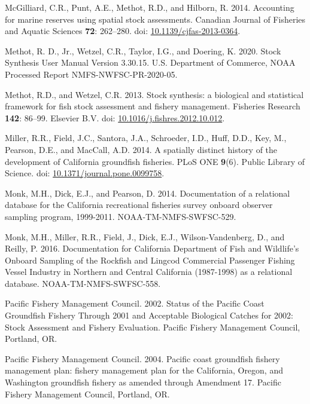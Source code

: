 \documentclass[11pt,
  english,
]{article}
\newlength{\cslhangindent}
\newenvironment{CSLReferences}[2] %
 {%
  \setlength{\parindent}{0pt}
  \ifodd #1 \everypar{\setlength{\hangindent}{\cslhangindent}}\ignorespaces\fi
  \ifnum #2 > 0
  \setlength{\parskip}{#2\baselineskip}
  \fi
 }%
 {}
\begin{document}
\begin{CSLReferences}{1}{0}
\leavevmode{}%
McGilliard, C.R., Punt, A.E., Methot, R.D., and Hilborn, R. 2014. {Accounting for marine reserves using spatial stock assessments}. Canadian Journal of Fisheries and Aquatic Sciences \textbf{72}: 262--280. doi: \href{https://doi.org/10.1139/cjfas-2013-0364}{10.1139/cjfas-2013-0364}.

\leavevmode{}%
Methot, R. D., Jr., Wetzel, C.R., Taylor, I.G., and Doering, K. 2020. {Stock Synthesis User Manual Version 3.30.15}. U.S. Department of Commerce, NOAA Processed Report NMFS-NWFSC-PR-2020-05.

\leavevmode{}%
Methot, R.D., and Wetzel, C.R. 2013. {Stock synthesis: a biological and statistical framework for fish stock assessment and fishery management}. Fisheries Research \textbf{142}: 86--99. Elsevier B.V. doi: \href{https://doi.org/10.1016/j.fishres.2012.10.012}{10.1016/j.fishres.2012.10.012}.

\leavevmode{}%
Miller, R.R., Field, J.C., Santora, J.A., Schroeder, I.D., Huff, D.D., Key, M., Pearson, D.E., and MacCall, A.D. 2014. {A spatially distinct history of the development of California groundfish fisheries}. PLoS ONE \textbf{9}(6). Public Library of Science. doi: \href{https://doi.org/10.1371/journal.pone.0099758}{10.1371/journal.pone.0099758}.

\leavevmode{}%
Monk, M.H., Dick, E.J., and Pearson, D. 2014. {Documentation of a relational database for the California recreational fisheries survey onboard observer sampling program, 1999-2011}. NOAA-TM-NMFS-SWFSC-529.

\leavevmode{}%
Monk, M.H., Miller, R.R., Field, J., Dick, E.J., Wilson-Vandenberg, D., and Reilly, P. 2016. {Documentation for California Department of Fish and Wildlife's Onboard Sampling of the Rockfish and Lingcod Commercial Passenger Fishing Vessel Industry in Northern and Central California (1987-1998) as a relational database}. NOAA-TM-NMFS-SWFSC-558.

\leavevmode{}%
Pacific Fishery Management Council. 2002. {Status of the Pacific Coast Groundfish Fishery Through 2001 and Acceptable Biological Catches for 2002: Stock Assessment and Fishery Evaluation.} Pacific Fishery Management Council, Portland, OR.

\leavevmode{}%
Pacific Fishery Management Council. 2004. {Pacific coast groundfish fishery management plan: fishery management plan for the California, Oregon, and Washington groundfish fishery as amended through Amendment 17}. Pacific Fishery Management Council, Portland, OR.


\end{CSLReferences}
\end{document}
